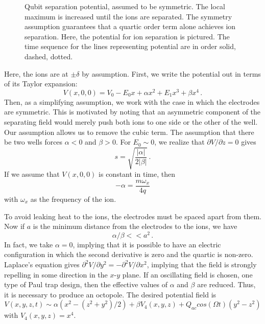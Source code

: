 \documentclass[12pt,a4paper]{amsart}
\numberwithin{equation}{section}
\theoremstyle{plain}
\theoremstyle{definition}
\begin{document}
\begin{figure}
\centering
{}
    \caption{Qubit separation potential, assumed to be symmetric. The local maximum is increased until the ions are separated. The symmetry assumption guarantees that a quartic order term alone achieves ion separation. Here, the potential for ion separation is pictured. The time sequence for the lines representing potential are in order solid, dashed, dotted. \cite{ioniTranSepa}}
    \label{fig:ioniTraSepa1}
\end{figure}

Here, the ions are at $\pm \delta$ by assumption. First, we write the potential out in terms of its Taylor expansion:
$$
V(x,0,0) = V_0 - E_0x+\alpha x^2 + E_1x^3 + \beta x^4 \,.
$$  
Then, as a simplifying assumption, we work with the case in which the electrodes are symmetric. This is motivated by noting that an asymmetric component of the separating field would merely push both ions to one side or the other of the well. Our assumption allows us to remove the cubic term. The assumption that there be two wells forces $\alpha < 0$ and $\beta > 0$. For $E_0 \sim 0$, we realize that $\partial V/\partial z = 0$ gives 
$$
s = \sqrt{\frac{|\alpha|}{2|\beta|}} \,.
$$
If we assume that $V(x,0,0)$ is constant in time, then 
$$-\alpha = \frac{m \omega_x}{4q} $$
with $\omega_x$ as the frequency of the ion.


To avoid leaking heat to the ions, the electrodes must be spaced apart from them. Now if $a$ is the minimum distance from the electrodes to the ions, we have
$$
\alpha / \beta << a^2\,.
$$
\cite{ioniTranSepa}
In fact, we take $\alpha = 0$, implying that it is possible to have an electric configuration in which the second derivative is zero and the quartic is non-zero. Laplace's equation gives $\partial^2V/\partial y^2 = -\partial^2V/\partial x^2$, implying that the field is strongly repelling in some direction in the $x$-$y$ plane. If an oscillating field is chosen, one type of Paul trap design, then the effective values of $\alpha$ and $\beta$ are reduced. Thus, it is necessary to produce an octopole. The desired potential field is
$$
V(x,y,z,t) \sim \alpha(x^2-(z^2+y^2)/2) + \beta V_4(x,y,z) + Q_{ac}cos(\Omega t)(y^2-z^2)
$$
with $V_4(x,y,z)=x^4$.
\end{document}

